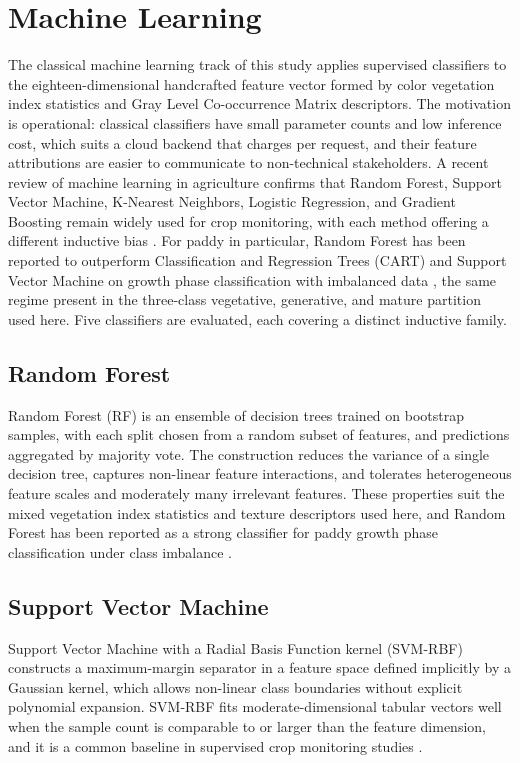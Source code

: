 \section{Machine Learning}

The classical machine learning track of this study applies supervised classifiers to the eighteen-dimensional handcrafted feature vector formed by color vegetation index statistics and Gray Level Co-occurrence Matrix descriptors. The motivation is operational: classical classifiers have small parameter counts and low inference cost, which suits a cloud backend that charges per request, and their feature attributions are easier to communicate to non-technical stakeholders. A recent review of machine learning in agriculture confirms that Random Forest, Support Vector Machine, K-Nearest Neighbors, Logistic Regression, and Gradient Boosting remain widely used for crop monitoring, with each method offering a different inductive bias \cite{benos2021ml}. For paddy in particular, Random Forest has been reported to outperform Classification and Regression Trees (CART) and Support Vector Machine on growth phase classification with imbalanced data \cite{suryono2022paddyrf}, the same regime present in the three-class vegetative, generative, and mature partition used here. Five classifiers are evaluated, each covering a distinct inductive family.

\subsection{Random Forest}

Random Forest (RF) is an ensemble of decision trees trained on bootstrap samples, with each split chosen from a random subset of features, and predictions aggregated by majority vote. The construction reduces the variance of a single decision tree, captures non-linear feature interactions, and tolerates heterogeneous feature scales and moderately many irrelevant features. These properties suit the mixed vegetation index statistics and texture descriptors used here, and Random Forest has been reported as a strong classifier for paddy growth phase classification under class imbalance \cite{suryono2022paddyrf}.

\subsection{Support Vector Machine}

Support Vector Machine with a Radial Basis Function kernel (SVM-RBF) constructs a maximum-margin separator in a feature space defined implicitly by a Gaussian kernel, which allows non-linear class boundaries without explicit polynomial expansion. SVM-RBF fits moderate-dimensional tabular vectors well when the sample count is comparable to or larger than the feature dimension, and it is a common baseline in supervised crop monitoring studies \cite{benos2021ml,suryono2022paddyrf}.

